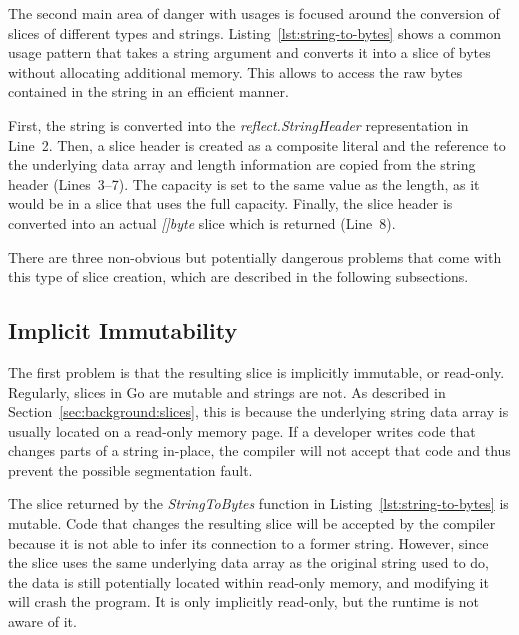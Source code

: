 The second main area of danger with \unsafe{} usages is focused around the conversion of slices of different types and
strings.
Listing~\ref{lst:string-to-bytes} shows a common \unsafe{} usage pattern that takes a string argument and converts it
into a slice of bytes without allocating additional memory.
This allows to access the raw bytes contained in the string in an efficient manner.



First, the string is converted into the \textit{reflect.StringHeader} representation in Line~2.
Then, a slice header is created as a composite literal and the reference to the underlying data array and length
information are copied from the string header (Lines~3--7).
The capacity is set to the same value as the length, as it would be in a slice that uses the full capacity.
Finally, the slice header is converted into an actual \textit{[]byte} slice which is returned (Line~8).

There are three non-obvious but potentially dangerous problems that come with this type of slice creation, which are
described in the following subsections.


\subsection{Implicit Immutability}\label{subsec:unsafe-security-problems:slice-casts:read-only}

The first problem is that the resulting slice is implicitly immutable, or read-only.
Regularly, slices in Go are mutable and strings are not.
As described in Section~\ref{sec:background:slices}, this is because the underlying string data array is usually located
on a read-only memory page.
If a developer writes code that changes parts of a string in-place, the compiler will not accept that code and thus
prevent the possible segmentation fault.

The slice returned by the \textit{StringToBytes} function in Listing~\ref{lst:string-to-bytes} is mutable.
Code that changes the resulting slice will be accepted by the compiler because it is not able to infer its connection to
a former string.
However, since the slice uses the same underlying data array as the original string used to do, the data is still
potentially located within read-only memory, and modifying it will crash the program.
It is only implicitly read-only, but the runtime is not aware of it.

